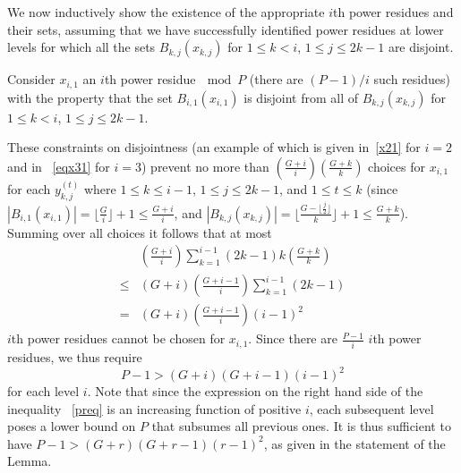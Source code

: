 We now inductively show the existence of the appropriate $i$th power
residues and their sets, assuming that we have successfully
identified power residues at lower levels for which all the sets
$B_{k,j}(x_{k,j})$ for $1 \leq k <i$, $1 \leq j \leq 2k-1$ are
disjoint.

Consider $x_{i,1}$ an $i$th power residue$~\mod P$ (there are
$(P-1)/i$ such  residues) with the property that the set
$B_{i,1}(x_{i,1})$ is disjoint from all of $B_{k,j}(x_{k,j})$ for $1
\leq k <i$, $1 \leq j \leq 2k-1$.

These  constraints on disjointness (an example of which is given
in~\eqref{x21} for $i=2$ and in ~\eqref{eqx31} for $i=3$) prevent no
more than $(\frac{G+i}{i})(\frac{G+k}{k})$ choices for $x_{i,1}$ for
each $y_{k,j}^{(t)}$ where $1 \leq k \leq i-1$, $1 \leq j \leq
2k-1$, and $1 \leq t \leq k$ (since $|B_{i,1}(x_{i,1})|=\lfloor
\frac{G}{i} \rfloor+1 \leq \frac{G+i}{i}$, and
$|B_{k,j}(x_{k,j})|=\lfloor \frac{G-\lfloor \frac{j}{2}\rfloor}{k}
\rfloor+1 \leq \frac{G+k}{k}$). Summing over all choices it follows
that at most
\begin{equation}\begin{array}{lll}{}& \left(\frac{G+i}{i}\right) \sum_{k=1}^{i-1}
(2k-1)k\left(\frac{G+k}{k}\right)\\\leq&
(G+i)\left(\frac{G+i-1}{i}\right) \sum_{k=1}^{i-1}
(2k-1)\\=&(G+i)\left(\frac{G+i-1}{i}\right)(i-1)^2
\end{array}\end{equation} $i$th power residues cannot be chosen for
$x_{i,1}$. Since there are $\frac{P-1}{i}$ $i$th power residues, we
thus require
\begin{equation}\label{preq}
P-1 > (G+i)(G+i-1)(i-1)^2
\end{equation}
for each level $i$. Note that since the expression on the right hand
side of the inequality ~\eqref{preq} is an increasing function of
positive $i$, each subsequent level poses a lower bound on $P$ that
subsumes all previous ones. It is thus sufficient to have $P-1
> (G+r)(G+r-1)(r-1)^2$, as given in the statement of the Lemma.

